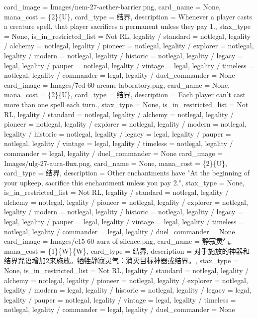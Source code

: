 \documentclass[lang = cn, color = black, 10pt]{AllThatStax}
\begin{document}
\card
{
	card_image = Images/nem-27-aether-barrier.png,
	card_name = None,
	mana_cost = \{2\}\{U\},
	card_type = 结界,
	description = Whenever a player casts a creature spell, that player sacrifices a permanent unless they pay {1}.,
	stax_type = None,
	is_in_restricted_list = Not RL,
	legality / standard = notlegal,
	legality / alchemy = notlegal,
	legality / pioneer = notlegal,
	legality / explorer = notlegal,
	legality / modern = notlegal,
	legality / historic = notlegal,
	legality / legacy = legal,
	legality / pauper = notlegal,
	legality / vintage = legal,
	legality / timeless = notlegal,
	legality / commander = legal,
	legality / duel_commander = None
}
\card
{
	card_image = Images/7ed-60-arcane-laboratory.png,
	card_name = None,
	mana_cost = \{2\}\{U\},
	card_type = 结界,
	description = Each player can't cast more than one spell each turn.,
	stax_type = None,
	is_in_restricted_list = Not RL,
	legality / standard = notlegal,
	legality / alchemy = notlegal,
	legality / pioneer = notlegal,
	legality / explorer = notlegal,
	legality / modern = notlegal,
	legality / historic = notlegal,
	legality / legacy = legal,
	legality / pauper = notlegal,
	legality / vintage = legal,
	legality / timeless = notlegal,
	legality / commander = legal,
	legality / duel_commander = None
}
\card
{
	card_image = Images/ulg-27-aura-flux.png,
	card_name = None,
	mana_cost = \{2\}\{U\},
	card_type = 结界,
	description = Other enchantments have "At the beginning of your upkeep, sacrifice this enchantment unless you pay {2}.",
	stax_type = None,
	is_in_restricted_list = Not RL,
	legality / standard = notlegal,
	legality / alchemy = notlegal,
	legality / pioneer = notlegal,
	legality / explorer = notlegal,
	legality / modern = notlegal,
	legality / historic = notlegal,
	legality / legacy = legal,
	legality / pauper = legal,
	legality / vintage = legal,
	legality / timeless = notlegal,
	legality / commander = legal,
	legality / duel_commander = None
}
\card
{
	card_image = Images/c15-60-aura-of-silence.png,
	card_name = 静寂灵气,
	mana_cost = \{1\}\{W\}\{W\},
	card_type = 结界,
	description = 对手施放的神器和结界咒语增加{2}来施放。牺牲静寂灵气：消灭目标神器或结界。,
	stax_type = None,
	is_in_restricted_list = Not RL,
	legality / standard = notlegal,
	legality / alchemy = notlegal,
	legality / pioneer = notlegal,
	legality / explorer = notlegal,
	legality / modern = legal,
	legality / historic = notlegal,
	legality / legacy = legal,
	legality / pauper = notlegal,
	legality / vintage = legal,
	legality / timeless = notlegal,
	legality / commander = legal,
	legality / duel_commander = None
}
\end{document}

